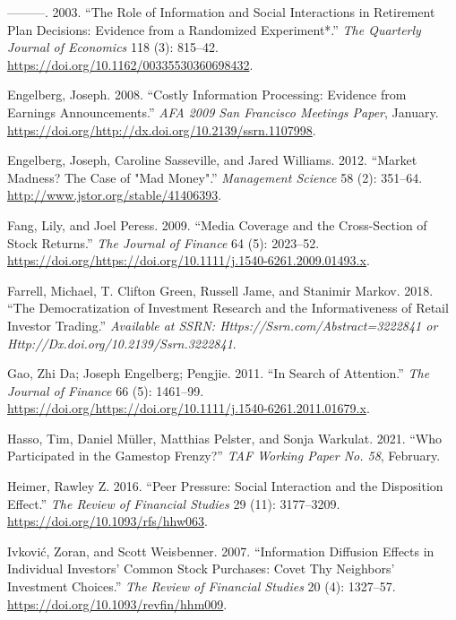 \documentclass[12pt,]{article}
\begin{document}
\leavevmode\hypertarget{ref-duflo2003}{}%
---------. 2003. ``The Role of Information and Social Interactions in
Retirement Plan Decisions: Evidence from a Randomized Experiment*.''
\emph{The Quarterly Journal of Economics} 118 (3): 815--42.
\url{https://doi.org/10.1162/00335530360698432}.

\leavevmode\hypertarget{ref-engelberg2008}{}%
Engelberg, Joseph. 2008. ``Costly Information Processing: Evidence from
Earnings Announcements.'' \emph{AFA 2009 San Francisco Meetings Paper},
January.
\href{https://doi.org/http://dx.doi.org/10.2139/ssrn.1107998\%20}{https://doi.org/http://dx.doi.org/10.2139/ssrn.1107998}.

\leavevmode\hypertarget{ref-engelberg2012}{}%
Engelberg, Joseph, Caroline Sasseville, and Jared Williams. 2012.
``Market Madness? The Case of "Mad Money".'' \emph{Management Science}
58 (2): 351--64. \url{http://www.jstor.org/stable/41406393}.

\leavevmode\hypertarget{ref-fang2009}{}%
Fang, Lily, and Joel Peress. 2009. ``Media Coverage and the
Cross-Section of Stock Returns.'' \emph{The Journal of Finance} 64 (5):
2023--52.
\url{https://doi.org/https://doi.org/10.1111/j.1540-6261.2009.01493.x}.

\leavevmode\hypertarget{ref-farrell2018}{}%
Farrell, Michael, T. Clifton Green, Russell Jame, and Stanimir Markov.
2018. ``The Democratization of Investment Research and the
Informativeness of Retail Investor Trading.'' \emph{Available at SSRN:
Https://Ssrn.com/Abstract=3222841 or
Http://Dx.doi.org/10.2139/Ssrn.3222841}.

\leavevmode\hypertarget{ref-da2011}{}%
Gao, Zhi Da; Joseph Engelberg; Pengjie. 2011. ``In Search of
Attention.'' \emph{The Journal of Finance} 66 (5): 1461--99.
\url{https://doi.org/https://doi.org/10.1111/j.1540-6261.2011.01679.x}.

\leavevmode\hypertarget{ref-hasso2021}{}%
Hasso, Tim, Daniel Müller, Matthias Pelster, and Sonja Warkulat. 2021.
``Who Participated in the Gamestop Frenzy?'' \emph{TAF Working Paper No.
58}, February.

\leavevmode\hypertarget{ref-heimer2016}{}%
Heimer, Rawley Z. 2016. ``Peer Pressure: Social Interaction and the
Disposition Effect.'' \emph{The Review of Financial Studies} 29 (11):
3177--3209. \url{https://doi.org/10.1093/rfs/hhw063}.

\leavevmode\hypertarget{ref-ivkovic2007}{}%
Ivković, Zoran, and Scott Weisbenner. 2007. ``Information Diffusion
Effects in Individual Investors' Common Stock Purchases: Covet Thy
Neighbors' Investment Choices.'' \emph{The Review of Financial Studies}
20 (4): 1327--57. \url{https://doi.org/10.1093/revfin/hhm009}.
\end{document}
